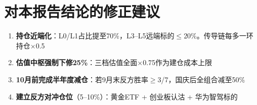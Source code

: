 \section{对本报告结论的修正建议}

\begin{enumerate}
  \item \textbf{持仓近端化}：L0/L1占比提至70\%，L3--L5远端标的$\leq$20\%。传导链每多一环持仓$\times$0.5
  \item \textbf{估值中枢强制下修25\%}：三档估值全面$\times$0.75作为建仓成本上限
  \item \textbf{10月前完成半年度减仓}：若9月末反方胜率$\geq$3/7，国庆后全组合减至50\%
  \item \textbf{建立反方对冲仓位}（5--10\%）：黄金ETF + 创业板认沽 + 华为智驾标的
\end{enumerate}
